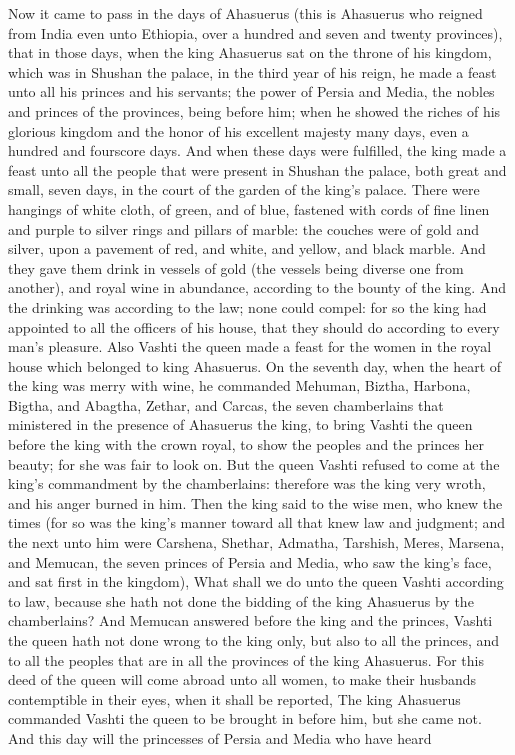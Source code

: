 


Now it came to pass in the days of Ahasuerus (this is Ahasuerus who reigned from India even unto Ethiopia, over a hundred and seven and twenty provinces), that in those days, when the king Ahasuerus sat on the throne of his kingdom, which was in Shushan the palace, in the third year of his reign, he made a feast unto all his princes and his servants; the power of Persia and Media, the nobles and princes of the provinces, being before him; when he showed the riches of his glorious kingdom and the honor of his excellent majesty many days, even a hundred and fourscore days. And when these days were fulfilled, the king made a feast unto all the people that were present in Shushan the palace, both great and small, seven days, in the court of the garden of the king’s palace. There were hangings of white cloth, of green, and of blue, fastened with cords of fine linen and purple to silver rings and pillars of marble: the couches were of gold and silver, upon a pavement of red, and white, and yellow, and black marble. And they gave them drink in vessels of gold (the vessels being diverse one from another), and royal wine in abundance, according to the bounty of the king. And the drinking was according to the law; none could compel: for so the king had appointed to all the officers of his house, that they should do according to every man’s pleasure.  Also Vashti the queen made a feast for the women in the royal house which belonged to king Ahasuerus. On the seventh day, when the heart of the king was merry with wine, he commanded Mehuman, Biztha, Harbona, Bigtha, and Abagtha, Zethar, and Carcas, the seven chamberlains that ministered in the presence of Ahasuerus the king, to bring Vashti the queen before the king with the crown royal, to show the peoples and the princes her beauty; for she was fair to look on. But the queen Vashti refused to come at the king’s commandment by the chamberlains: therefore was the king very wroth, and his anger burned in him.  Then the king said to the wise men, who knew the times (for so was the king’s manner toward all that knew law and judgment; and the next unto him were Carshena, Shethar, Admatha, Tarshish, Meres, Marsena, and Memucan, the seven princes of Persia and Media, who saw the king’s face, and sat first in the kingdom), What shall we do unto the queen Vashti according to law, because she hath not done the bidding of the king Ahasuerus by the chamberlains? And Memucan answered before the king and the princes, Vashti the queen hath not done wrong to the king only, but also to all the princes, and to all the peoples that are in all the provinces of the king Ahasuerus. For this deed of the queen will come abroad unto all women, to make their husbands contemptible in their eyes, when it shall be reported, The king Ahasuerus commanded Vashti the queen to be brought in before him, but she came not. And this day will the princesses of Persia and Media who have heard 